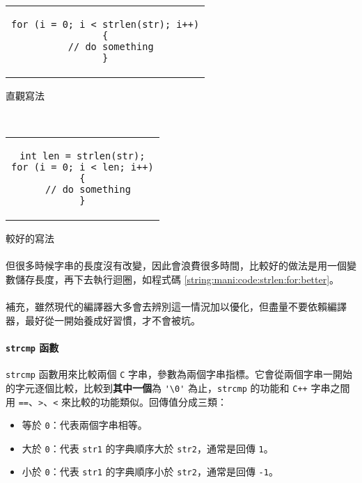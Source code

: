 \documentclass[12pt,a4paper,oneside]{report}
\begin{document}
\begin{CJK}{UTF8}{bkai}
\begin{code}[h!]
  \centering
  \begin{subcode}{.58\textwidth}
    \centering
    \begin{tabular}{c}
    \begin{lstlisting}
for (i = 0; i < strlen(str); i++)
{
  // do something
}
    \end{lstlisting}
    \end{tabular}
    \caption{直觀寫法}
    \label{string:mani:code:strlen:for:naive}
  \end{subcode}
  ~
  \begin{subcode}{.38\textwidth}
    \centering
    \begin{tabular}{c}
    \begin{lstlisting}
int len = strlen(str);
for (i = 0; i < len; i++)
{
  // do something
}
    \end{lstlisting}
    \end{tabular}
    \caption{較好的寫法}
    \label{string:mani:code:strlen:for:better}
  \end{subcode}
  \caption{注意 \lstinline!strlen! 的用法}
  \label{string:mani:code:strlen:for}
\end{code}

\paragraph{}但很多時候字串的長度沒有改變，因此會浪費很多時間，比較好的做法是用一個變數儲存長度，再下去執行迴圈，如程式碼 \ref{string:mani:code:strlen:for:better}。
\paragraph{}補充，雖然現代的編譯器大多會去辨別這一情況加以優化，但盡量不要依賴編譯器，最好從一開始養成好習慣，才不會被坑。

\paragraph{\lstinline!strcmp! 函數}\lstinline!strcmp! 函數用來比較兩個 \texttt{C} 字串，參數為兩個字串指標。它會從兩個字串一開始的字元逐個比較，比較到\textbf{其中一個}為 \lstinline!'\0'! 為止，\lstinline!strcmp! 的功能和 \texttt{C++} 字串之間用 \lstinline!==!、\lstinline!>!、\lstinline!<! 來比較的功能類似。回傳值分成三類：

\begin{itemize}
\item 等於 \lstinline!0!：代表兩個字串相等。
\item 大於 \lstinline!0!：代表 \lstinline!str1! 的字典順序大於 \lstinline!str2!，通常是回傳 \lstinline!1!。
\item 小於 \lstinline!0!：代表 \lstinline!str1! 的字典順序小於 \lstinline!str2!，通常是回傳 \lstinline!-1!。
\end{itemize}


\end{CJK}
\end{document}

